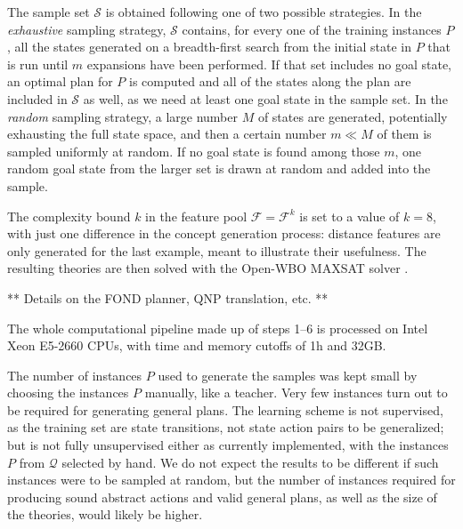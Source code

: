 \documentclass[letterpaper]{article} %
\newcommand{\Q}{\mathcal{Q}}
\begin{document}
The sample set $\mathcal{S}$ is obtained following one of two possible strategies.
In the \emph{exhaustive} sampling strategy,
$\mathcal{S}$ contains, for every one of the training instances $P$,
all the states generated on a breadth-first search from the initial state in $P$
that is run until $m$ expansions have been performed. If that set includes no goal state,
an optimal plan for $P$ is computed and all of the states along the plan are included in $\mathcal{S}$ as well,
as we need at least one goal state in the sample set.
%
In the \emph{random} sampling strategy, a large number $M$ of states are generated, potentially exhausting the full state space,
and then a certain number $m \ll M$ of them is sampled uniformly at random. If no goal state is found among those $m$,
one random goal state from the larger set is drawn at random and added into the sample.

The complexity bound $k$ in the feature pool $\mathcal{F} = \mathcal{F}^k$ is set to a value of $k=8$,
with just one difference in the concept generation process: distance features are only generated for the last example,
meant to illustrate their usefulness.
The resulting theories are then solved with the Open-WBO MAXSAT solver \cite{martins2014open}.

** Details on the FOND planner, QNP translation, etc. **

The whole computational pipeline made up of steps 1--6 is processed on Intel Xeon E5-2660 CPUs,
with time and memory cutoffs of 1h and 32GB.

The number of instances $P$ used to generate the samples was kept small 
by choosing the instances $P$ manually, like a teacher. 
Very few instances turn out to be required for generating general plans.
The learning scheme is not supervised, as the training set are state 
transitions, not state action pairs to be generalized; but is not fully unsupervised either as currently 
implemented, with the instances $P$ from $\Q$ selected by hand.
We do not expect the results to be different if such instances
were to be sampled at random, but the number of instances required for 
producing sound abstract actions and valid general plans, as well as the size of the 
theories, would likely be higher.
\end{document}
